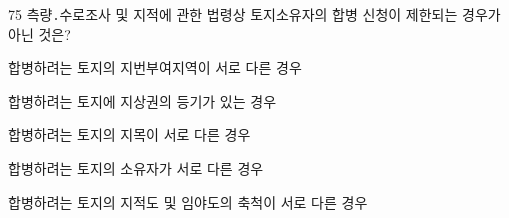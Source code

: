 \begin{question}{75}
측량․수로조사 및 지적에 관한 법령상 토지소유자의 합병 신청이 제한되는 경우가 아닌 것은?
\begin{choices}
  \item 합병하려는 토지의 지번부여지역이 서로 다른 경우
  \item 합병하려는 토지에 지상권의 등기가 있는 경우
  \item 합병하려는 토지의 지목이 서로 다른 경우
  \item 합병하려는 토지의 소유자가 서로 다른 경우
  \item 합병하려는 토지의 지적도 및 임야도의 축척이 서로 다른 경우
\end{choices}
\end{question}
